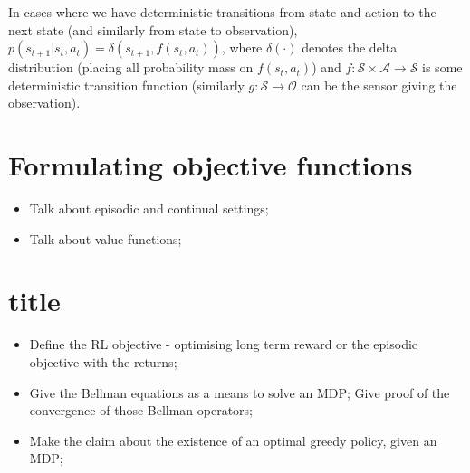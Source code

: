 \documentclass{report}
\numberwithin{equation}{section}
\numberwithin{figure}{section}
\numberwithin{table}{section}
\numberwithin{algorithm}{section}
\begin{document}
In cases where we have deterministic transitions from state and action 
to the next state (and similarly from state to observation), 
$p(s_{t+1}|s_t, a_t)=\delta(s_{t+1},f(s_t, a_t))$, where 
$\delta(\cdot)$ denotes the delta distribution (placing all 
probability mass on $f(s_t, a_t)$) and 
$f: \mathcal{S}\times\mathcal{A}\rightarrow \mathcal{S}$ is some deterministic 
transition function (similarly $g:\mathcal{S}\rightarrow \mathcal{O}$ 
can be the sensor giving the observation).

\section{Formulating objective functions}
\label{sec:RLObjectives}
\begin{itemize}
  \item Talk about episodic and continual settings;
  \item Talk about value functions;
\end{itemize}

\section{title}



\begin{itemize}
  \item Define the RL objective - optimising long term reward 
    or the episodic objective with the returns;
  \item Give the Bellman equations as a means to solve an MDP;
    Give proof of the convergence of those Bellman operators;
  \item Make the claim about the existence of an optimal greedy 
    policy, given an MDP;
\end{itemize}

\end{document}
